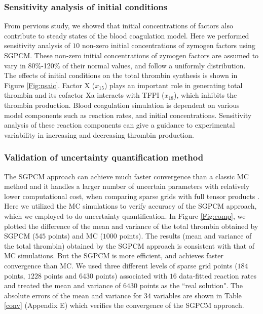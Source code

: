 \subsubsection*{Sensitivity analysis of initial conditions}
\label{sec:sens_init} From pervious study, we showed that initial
concentrations of factors also contribute to steady states of the
blood coagulation model. %
Here we performed sensitivity analysis of $10$ non-zero initial
concentrations of zymogen factors using SGPCM. These non-zero
initial concentrations of zymogen factors are assumed to vary in
80\%-120\% of their normal values, and follow a uniformly
distribution. The effects of initial conditions on the total
thrombin synthesis is shown in Figure \ref{Fig:nsaic}. Factor X
($x_{15}$) plays an important role in generating total thrombin and
its cofactor Xa interacts with TFPI ($x_{18}$), which inhibits the
thrombin production. Blood coagulation simulation is dependent on
various model components such as reaction rates, and initial
concentrations. Sensitivity analysis of these reaction components
can give a guidance to experimental variability in increasing and
decreasing thrombin production.



\subsubsection*{Validation of uncertainty quantification method}
The SGPCM approach can achieve much faster convergence than a
classic MC method and it handles a larger number of uncertain
parameters with relatively lower computational cost, when comparing
sparse grids with full tensor products \cite{LinAMTAWR}. Here we
utilized the MC simulations to verify accuracy of the SGPCM
approach, which we employed to do uncertainty quantification. In
Figure \ref{Fig:comp}, we plotted the difference of the mean and
variance of the total thrombin obtained by SGPCM ($545$ points) and
MC ($1000$ points). The results (mean and variance of the total
thrombin) obtained by the SGPCM approach is consistent with that of
MC simulations. But the SGPCM is more efficient, and achieves faster
convergence than MC. We used three different levels of sparse grid
points ($184$ points, $1228$ points and $6430$ points) associated
with $16$ data-fitted reaction rates and treated the mean and
variance of $6430$ points as the ``real solution". The absolute
errors of the mean and variance for $34$ variables are shown in
Table \ref{conv} (Appendix E) which verifies the convergence of the
SGPCM approach.



